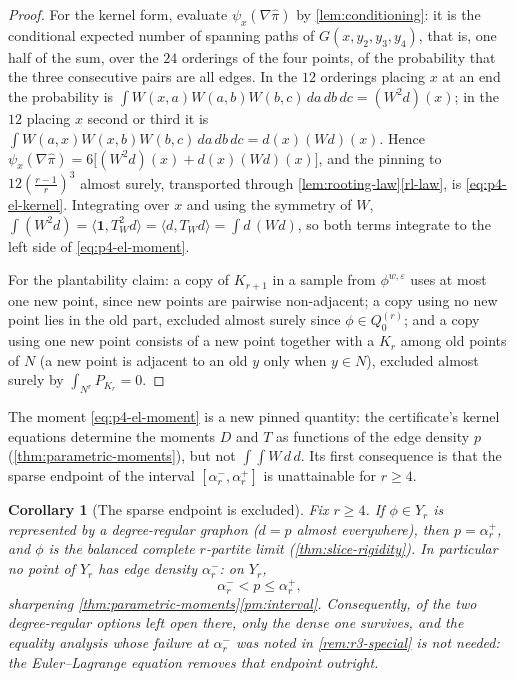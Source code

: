 \documentclass[11pt]{article}
\newtheorem{corollary}[corollary]{Corollary}
\theoremstyle{definition}
\newcommand{\eps}{\varepsilon}
\newcommand{\one}{\mathbf 1}
\begin{document}
\begin{proof}
For the kernel form, evaluate $\psi_x(\nabla\widehat\pi)$ by
\cref{lem:conditioning}: it is the conditional expected number of spanning paths of
$G(x,y_2,y_3,y_4)$, that is, one half of the sum, over the $24$ orderings of the four
points, of the probability that the three consecutive pairs are all edges.  In the
$12$ orderings placing $x$ at an end the probability is
$\int W(x,a)W(a,b)W(b,c)\,da\,db\,dc=(W^2d)(x)$; in the $12$ placing $x$ second or
third it is $\int W(a,x)W(x,b)W(b,c)\,da\,db\,dc=d(x)(Wd)(x)$.  Hence
$\psi_x(\nabla\widehat\pi)=6\bigl[(W^2d)(x)+d(x)(Wd)(x)\bigr]$, and the pinning to
$12(\tfrac{r-1}r)^3$ almost surely, transported through
\cref{lem:rooting-law}\ref{rl-law}, is \eqref{eq:p4-el-kernel}.  Integrating over $x$
and using the symmetry of $W$,
$\int(W^2d)=\langle\one,T_W^2d\rangle=\langle d,T_Wd\rangle=\int d\,(Wd)$, so both
terms integrate to the left side of \eqref{eq:p4-el-moment}.

For the plantability claim: a copy of $K_{r+1}$ in a sample from
$\phi^{w,\eps}$ uses at most one new point, since new points are pairwise
non-adjacent; a copy using no new point lies in the old part, excluded almost surely
since $\phi\in Q_0^{(r)}$; and a copy using one new point consists of a new point
together with a $K_r$ among old points of $N$ (a new point is adjacent to an old $y$
only when $y\in N$), excluded almost surely by $\int_{N^r}P_{K_r}=0$.
\end{proof}

The moment \eqref{eq:p4-el-moment} is a new pinned quantity: the certificate's kernel
equations determine the moments $D$ and $T$ as functions of the edge density $p$
(\cref{thm:parametric-moments}), but not $\int\!\!\int W\,d\,d$.  Its first
consequence is that the sparse endpoint of the interval
$[\alpha_r^-,\alpha_r^+]$ is unattainable for $r\ge4$.

\begin{corollary}[The sparse endpoint is excluded]\label{cor:p4-lower-endpoint}
Fix $r\ge4$.  If $\phi\in Y_r$ is represented by a degree-regular graphon
($d=p$ almost everywhere), then $p=\alpha_r^+$, and $\phi$ is the balanced complete
$r$-partite limit \textup(\cref{thm:slice-rigidity}\textup).  In particular no point of
$Y_r$ has edge density $\alpha_r^-$: on $Y_r$,
\[
  \alpha_r^-<p\le\alpha_r^+ ,
\]
sharpening \cref{thm:parametric-moments}\ref{pm:interval}.  Consequently, of the two
degree-regular options left open there, only the dense one survives, and the equality
analysis whose failure at $\alpha_r^-$ was noted in \cref{rem:r3-special} is not
needed: the Euler--Lagrange equation removes that endpoint outright.
\end{corollary}
\end{document}
